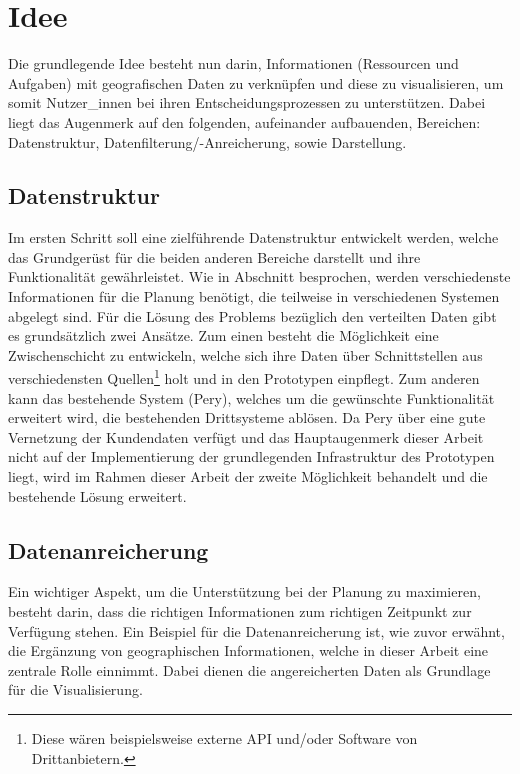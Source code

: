 \documentclass[Bachelorarbeit.tex]{subfiles}
\begin{document}
\begin{comment}
Als Grundlage für den Prototypen dient die Software Pery der Firma Perfany GmbH. 
Dabei handelt es sich um 
Wobei der Fokus auf dem Ticket Modul der Software ruht. Dabei ist das Anwendungskonzept des Moduls so ausgelegt das sämtliche Aufgaben, die die Firma betreffen , einzeln als Tickets erfasst werden. 
\end{comment}

\section{Idee}
\label{chap:einfuehrung:sec:idee}

Die grundlegende Idee besteht nun darin, Informationen (Ressourcen und Aufgaben) mit geografischen Daten zu verknüpfen und diese zu visualisieren, um somit Nutzer\_innen bei ihren Entscheidungsprozessen zu unterstützen. 
Dabei liegt das Augenmerk auf den folgenden, aufeinander aufbauenden, Bereichen: Datenstruktur, Datenfilterung/-Anreicherung, sowie Darstellung.


\subsection*{Datenstruktur}
Im ersten Schritt soll eine zielführende Datenstruktur entwickelt werden, welche das Grundgerüst für die beiden anderen Bereiche darstellt und ihre Funktionalität gewährleistet.
Wie in Abschnitt  besprochen, werden verschiedenste Informationen für die Planung benötigt, die teilweise in verschiedenen Systemen abgelegt sind. 
Für die Lösung des Problems bezüglich den verteilten Daten gibt es grundsätzlich zwei Ansätze.
Zum einen besteht die Möglichkeit eine Zwischenschicht zu entwickeln, welche sich ihre Daten über Schnittstellen aus verschiedensten Quellen\footnote{Diese wären beispielsweise externe \ac{API} und/oder Software von Drittanbietern.} holt und in den Prototypen einpflegt.
Zum anderen kann das bestehende System (Pery), welches um die gewünschte Funktionalität erweitert wird, die bestehenden Drittsysteme ablösen. 
Da Pery über eine gute Vernetzung der Kundendaten verfügt und das Hauptaugenmerk dieser Arbeit nicht auf der Implementierung der grundlegenden Infrastruktur des Prototypen liegt, wird im Rahmen dieser Arbeit der zweite Möglichkeit behandelt und die bestehende Lösung erweitert.

\subsection*{Datenanreicherung}
Ein wichtiger Aspekt, um die Unterstützung bei der Planung zu maximieren, besteht darin, dass die richtigen Informationen zum richtigen Zeitpunkt zur Verfügung stehen. 
Ein Beispiel für die Datenanreicherung ist, wie zuvor erwähnt, die Ergänzung von geographischen Informationen, welche in dieser Arbeit eine zentrale Rolle einnimmt. 
Dabei dienen die angereicherten Daten als Grundlage für die Visualisierung.
\end{document}
